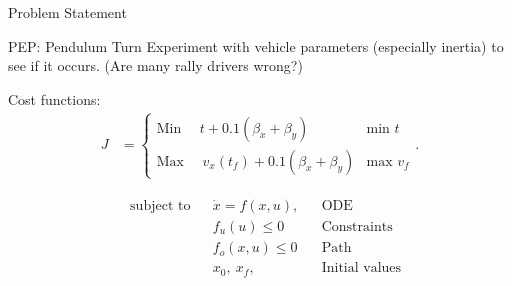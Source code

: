 \begin{frame}{Problem Statement}
    \begin{alertblock}{PEP: Pendulum Turn}
        Experiment with vehicle parameters (especially inertia) to see if it occurs. (Are many rally drivers wrong?)
    \end{alertblock}
    \pause
    \begin{exampleblock}{}
        Cost functions:
        \begin{align*}
            J &= \begin{cases} 
                    \text{Min }\quad t + 0.1\left(\beta_x + \beta_y\right) & \text{min } t \\
                    \text{Max }\quad v_x(t_f) + 0.1\left(\beta_x + \beta_y\right) & \text{max } v_f 
                 \end{cases}.
        \end{align*}
    \end{exampleblock}
    \begin{align*}
        & \text{subject to} 
        & & \dot x = f(x,u), && \text{ODE}\\
        &&& f_u(u) \leq 0 && \text{Constraints}\\
        &&& f_o(x,u) \leq 0 && \text{Path} \\
        &&& x_0,\ x_f, && \text{Initial values}
    \end{align*}
\end{frame}